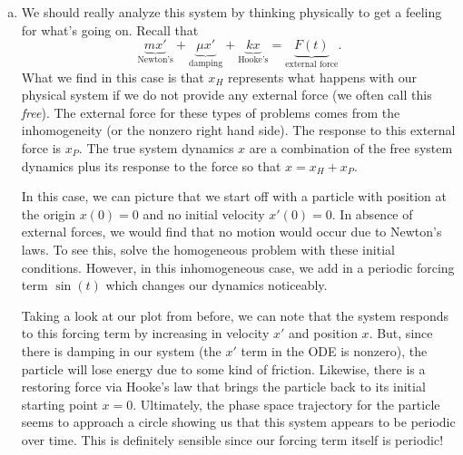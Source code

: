\documentclass[12pt]{article} %
\begin{document}
\begin{solution}
\begin{enumerate}[(a)]
    \item We should really analyze this system by thinking physically to get a feeling for what's going on. Recall that
    \[
    \underbrace{mx'}_{\textrm{Newton's}} + \underbrace{\mu x'}_{\textrm{damping}} + \underbrace{kx}_{\textrm{Hooke's}} = \underbrace{F(t)}_{\textrm{external force}}.
    \]
    What we find in this case is that $x_H$ represents what happens with our physical system if we do not provide any external force (we often call this \emph{free}). The external force for these types of problems comes from the inhomogeneity (or the nonzero right hand side). The response to this external force is $x_P$. The true system dynamics $x$ are a combination of the free system dynamics plus its response to the force so that $x=x_H+x_P$. 
    
    In this case, we can picture that we start off with a particle with position at the origin $x(0)=0$ and no initial velocity $x'(0)=0$. In absence of external forces, we would find that no motion would occur due to Newton's laws. To see this, solve the homogeneous problem with these initial conditions. However, in this inhomogeneous case, we add in a periodic forcing term $\sin(t)$ which changes our dynamics noticeably. 
    
    Taking a look at our plot from before, we can note that the system responds to this forcing term by increasing in velocity $x'$ and position $x$. But, since there is damping in our system (the $x'$ term in the ODE is nonzero), the particle will lose energy due to some kind of friction. Likewise, there is a restoring force via Hooke's law that brings the particle back to its initial starting point $x=0$. Ultimately, the phase space trajectory for the particle seems to approach a circle showing us that this system appears to be periodic over time. This is definitely sensible since our forcing term itself is periodic!
\end{enumerate}
\end{solution}
\end{document}
